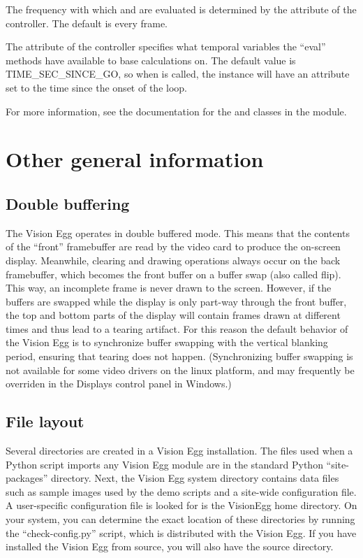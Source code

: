 \documentclass{manual}
\begin{document}
The frequency with which  and
 are evaluated is determined by the
 attribute of the controller.  The default
 is every frame.

The  attribute of the controller specifies
what temporal variables the ``eval'' methods have available to base
calculations on.  The default value is TIME_SEC_SINCE_GO, so when
 is called, the instance will have an
attribute  set to the time since the onset of
the  loop.

For more information, see the documentation for the 
and  classes in the 
module.

\chapter{Other general information \label{other info}}

\section{Double buffering}

The Vision Egg operates in double buffered mode.  This means that the
contents of the ``front'' framebuffer are read by the video card to
produce the on-screen display.  Meanwhile, clearing and drawing
operations always occur on the back framebuffer, which becomes the
front buffer on a buffer swap (also called flip).  This way, an
incomplete frame is never drawn to the screen.  However, if the
buffers are swapped while the display is only part-way through the
front buffer, the top and bottom parts of the display will contain
frames drawn at different times and thus lead to a tearing artifact.
For this reason the default behavior of the Vision Egg is to
synchronize buffer swapping with the vertical blanking period,
ensuring that tearing does not happen.  (Synchronizing buffer swapping
is not available for some video drivers on the linux platform, and may
frequently be overriden in the Displays control panel in Windows.)

\section{File layout}

Several directories are created in a Vision Egg installation.  The
files used when a Python script imports any Vision Egg module are in
the standard Python ``site-packages'' directory.  Next, the Vision Egg
system directory contains data files such as sample images used by the
demo scripts and a site-wide configuration file.  A user-specific
configuration file is looked for is the VisionEgg home directory.  On
your system, you can determine the exact location of these directories
by running the ``check-config.py'' script, which is distributed with
the Vision Egg.  If you have installed the Vision Egg from source, you
will also have the source directory.
\end{document}
